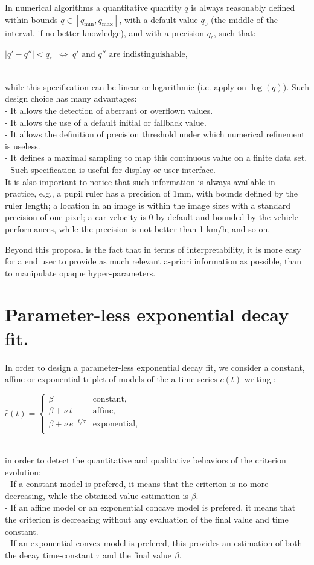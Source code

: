 \documentclass{article}
\newcommand{\eqline}[1]{\\\centerline{$#1$}\\}
\begin{document}
In numerical algorithms a quantitative quantity $q$ is always reasonably defined within bounds $q \in [q_{\min}, q_{\max}]$, with a default value $q_0$ (the middle of the interval, if no better knowledge), and with a precision $q_\epsilon$, such that:
\eqline{|q' - q''| < q_\epsilon \;\;\Leftrightarrow\; \mbox{$q'$ and $q''$ are indistinguishable},}
while this specification can be linear or logarithmic (i.e. apply on $\log(q)$).
Such design choice has many advantages:
\\- It allows the detection of aberrant or overflown values.
\\- It allows the use of a default initial or fallback value.
\\- It allows the definition of precision threshold under which numerical refinement is useless.
\\- It defines a maximal sampling to map this continuous value on a finite data set.
\\- Such specification is useful for display or user interface.
\\ It is also important to notice that such information is always available in practice, e.g., a pupil ruler has a precision of 1mm, with bounds defined by the ruler length; a location in an image is within the image sizes with a standard precision of one pixel; a car velocity is 0 by default and bounded by the vehicle performances, while the precision is not better than 1 km/h; and so on.

Beyond this proposal is the fact that in terms of interpretability, it is more easy for a end user to provide as much relevant a-priori information as possible, than to manipulate opaque hyper-parameters.

\clearpage \section{Parameter-less exponential decay fit.} \label{about-decay-fit}

\fi

In order to design a parameter-less exponential decay fit, we consider a constant, affine or exponential triplet of models of the a time series $c(t)$ writing :
\eqline{\hat{c}(t) = \left\{\begin{array}{ll} 
 \beta                      & \mbox{constant,} \\
 \beta + \nu \, t           & \mbox{affine,} \\
 \beta + \nu \, e^{-t/\tau} & \mbox{exponential,} \\
\end{array}\right.}
in order to detect the quantitative and qualitative behaviors of the criterion evolution:
\\- If a constant model is prefered, it means that the criterion is no more decreasing, while the obtained value estimation is $\beta$.
\\- If an affine model or an exponential concave model is prefered, it means that the criterion is decreasing without any evaluation of the final value and time constant.
\\- If an exponential convex model is prefered, this provides an estimation of both the decay time-constant $\tau$ and the final value $\beta$.
\end{document}

